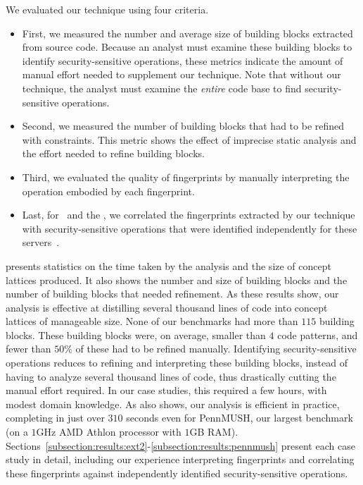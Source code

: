 We evaluated our technique using four criteria. 

\begin{itemize}
%
\item First, we measured the number and average size of building blocks
extracted from source code. Because an analyst must examine these building
blocks to identify security-sensitive operations, these metrics indicate
the amount of manual effort needed to supplement our technique. Note that
without our technique, the analyst must examine the \textit{entire} code base
to find security-sensitive operations. 
%
\item Second, we measured the number of building blocks that had to be
refined with constraints. This metric shows the effect of imprecise static
analysis and the effort needed to refine building blocks. 
%
\item Third, we evaluated the quality of fingerprints by manually interpreting
the operation embodied by each fingerprint. 
%
\item Last, for \ext\ and the \xserver, we correlated the fingerprints
extracted by our technique with security-sensitive operations that were
identified independently for these servers~\cite{ksv03,wcs+02}.  
%
\end{itemize}

 presents statistics on the time taken by the
analysis and the size of concept lattices produced. It also shows the number
and size of building blocks and the number of building blocks
that needed refinement. As these results show, our analysis is effective at
distilling several thousand lines of code into concept lattices of manageable
size. None of our benchmarks had more than $115$ building blocks. These
building blocks were, on average, smaller than $4$ code patterns, and
fewer than $50\%$ of these had to be refined manually.  Identifying
security-sensitive operations reduces to refining and interpreting these
building blocks, instead of having to analyze several thousand lines of
code, thus drastically cutting the manual effort required. In our case studies,
this required a few hours, with modest domain knowledge. As
 also shows, our analysis is efficient in
practice, completing in just over $310$ seconds even for PennMUSH, our largest
benchmark (on a $1$GHz AMD Athlon processor with $1$GB RAM).
Sections~\ref{subsection:results:ext2}-\ref{subsection:results:pennmush}
present each case study in detail, including our experience interpreting
fingerprints and correlating these fingerprints against independently
identified security-sensitive operations.


